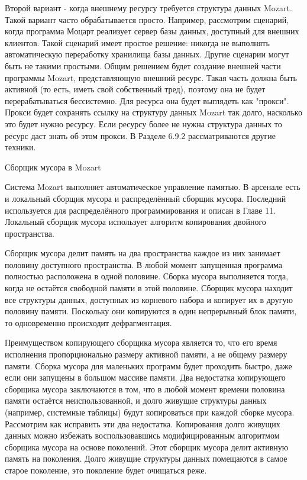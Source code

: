 Второй вариант - когда внешнему ресурсу требуется структура данных Mozart. Такой вариант часто обрабатывается просто. Например, рассмотрим сценарий, когда программа Моцарт реализует сервер базы данных, доступный для внешних клиентов. Такой сценарий имеет простое решение: никогда не выполнять автоматическую переработку хранилища базы данных. Другие сценарии могут быть не такими простыми. Общим решением будет создание внешней части программы Mozart, представляющую внешний ресурс. Такая часть должна быть активной (то есть, иметь свой собственный тред), поэтому она не будет перерабатываться бессистемно. Для ресурса она будет выглядеть как "прокси". Прокси будет сохранять ссылку на структуру данных Mozart так долго, насколько это будет нужно ресурсу. Если ресурсу более не нужна структура данных то ресурс даст знать об этом прокси. В Разделе 6.9.2 рассматриваются другие техники.

Сборщик мусора в Mozart

Система Mozart выполняет автоматическое управление памятью. В арсенале есть и локальный сборщик мусора и распределённый сборщик мусора. Последний используется для распределённого программирования и описан в Главе 11. Локальный сборщик мусора использует алгоритм копирования двойного пространства.

Сборщик мусора делит память на два пространства каждое из них занимает половину доступного пространства. В любой момент запущенная программа полностью расположена в одной половине. Сборка мусора выполняется тогда, когда не остаётся свободной памяти в этой половине. Сборщик мусора находит все структуры данных, доступных из корневого набора и копирует их в другую половину памяти. Поскольку они копируются в один непрерывный блок памяти, то одновременно происходит дефрагментация.

Преимуществом копирующего сборщика мусора является то, что его время исполнения пропорционально размеру активной памяти, а не общему размеру памяти. Сборка мусора для маленьких программ будет проходить быстро, даже если они запущены в большом массиве памяти. Два недостатка копирующего сборщика мусора заключаются в том, что в любой момент времени половина памяти остаётся неиспользованной, и долго живущие структуры данных (например, системные таблицы) будут копироваться при каждой сборке мусора. Рассмотрим как исправить эти два недостатка. Копирования долго живущих данных можно избежать воспользовавшись модифицированным алгоритмом сборщика мусора на основе поколений. Этот сборщик мусора делит активную память на поколения. Долго живущие структуры данных помещаются в самое старое поколение, это поколение будет очищаться реже.

